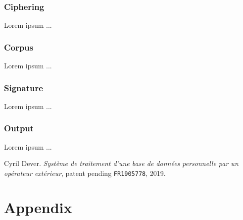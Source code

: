 \documentclass[twoside,twocolumn]{article}
\theoremstyle{definition}
\theoremstyle{remark}
\begin{document}
\subsubsection{Ciphering}

Lorem ipsum ...

\subsubsection{Corpus}

Lorem ipsum ...

\subsubsection{Signature}

Lorem ipsum ...

\subsubsection{Output}

Lorem ipsum ...

\tableofcontents %


\begin{thebibliography}{99} %

Cyril Dever. \emph{Système de traitement d'une base de données personnelle par un opérateur extérieur}, patent pending \texttt{FR1905778}, 2019.

\end{thebibliography}


\onecolumn
\section*{Appendix}
\end{document}
